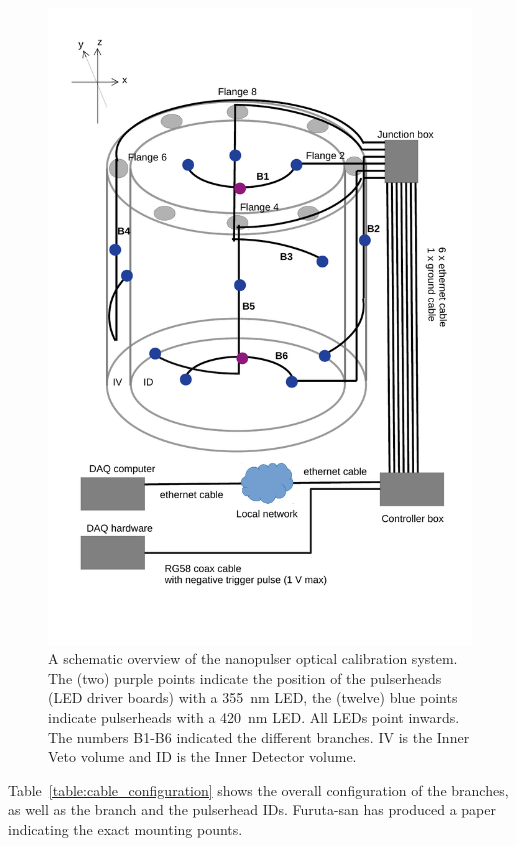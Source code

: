 \begin{figure}
\begin{center}	
  \includegraphics[width=0.75\linewidth]{figures/JSNS2_led_system_overview.pdf}
  \caption{A schematic overview of the nanopulser optical calibration system. The (two) purple points indicate the position of the pulserheads (LED driver boards) with a 355~nm LED, the (twelve) blue points indicate pulserheads with a 420~nm LED. All LEDs point inwards. The numbers B1-B6 indicated the different branches. IV is the Inner Veto volume and ID is the Inner Detector volume.}
  \label{figure:controlbox}
\end{center}
\end{figure}

Table~\ref{table:cable_configuration} shows the overall configuration of the branches, as well as the branch and the pulserhead IDs. Furuta-san has produced a paper indicating the exact mounting pounts.


